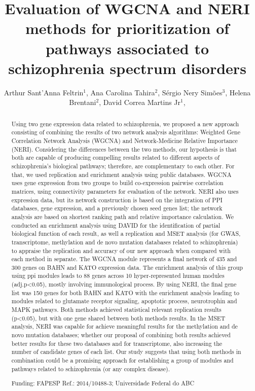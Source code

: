 \documentclass[twoside]{article}
\title{\vspace{-15mm}\fontsize{24pt}{10pt}\selectfont\textbf{ Evaluation of WGCNA and NERI methods for prioritization of pathways associated to schizophrenia spectrum disorders }} %
\author{ Arthur Sant'Anna Feltrin$^{1}$, Ana Carolina Tahira$^{2}$, Sérgio Nery Simões$^{3}$, Helena Brentani$^{2}$, David Correa Martins Jr$^{1}$, }
\affil{ 1 Universidade Federal do ABC

2 Universidade de São Paulo

3 Instituto Federal do Espírito Santo

 }
\date{}
\begin{document}
  
  
  \maketitle %
  
  
  \thispagestyle{fancy} %
  
  
  \begin{abstract}
  Using two gene expression data related to schizophrenia, we proposed a new approach consisting of combining the results of two network analysis algorithms: Weighted Gene Correlation Network Analysis (WGCNA) and Network-Medicine Relative Importance (NERI). Considering the differences between the two methods, our hypothesis is that both are capable of producing compelling results related to different aspects of schizophrenia's biological pathways; therefore, are complementary to each other. For that, we used replication and enrichment analysis using public databases. WGCNA uses gene expression from two groups to build co-expression pairwise correlation matrices, using connectivity parameters for evaluation of the network. NERI also uses expression data, but its network construction is based on the integration of PPI databases, gene expression, and a previously chosen seed genes list; the network analysis are based on shortest ranking path and relative importance calculation. We conducted an enrichment analysis using DAVID for the identification of partial biological function of each result, as well a replication and MSET analysis (for GWAS, transcriptome, methylation and de novo mutation databases related to schizophrenia) to appraise the replication and accuracy of our new approach when compared with each method in separate. The WGCNA module represents a final network of 435 and 300 genes on BAHN and KATO expression data. The enrichment analysis of this group using ppi modules leads to 88 genes across 10 hyper-represented human modules (adj.p<0.05), mostly involving immunological process. By using NERI, the final gene list was 150 genes for both BAHN and KATO with the enrichment analysis leading to modules related to glutamate receptor signaling, apoptotic process, neurotrophin and MAPK pathways. Both methods achieved statistical relevant replication results (p<0.05), but with one gene shared between both methods results. In the MSET analysis, NERI was capable for achieve meaningful results for the methylation and de novo mutation databases; whether our proposal of combining both results achieved better results for these two databases and for transcriptome, also increasing the number of candidate genes of each list. Our study suggests that using both methods in combination could be a promising approach for establishing a group of modules and pathways related to schizophrenia (or any complex disease).
  
  Funding: FAPESP Ref.: 2014/10488-3; Universidade Federal do ABC \\ 
  \end{abstract}
  
\end{document}
